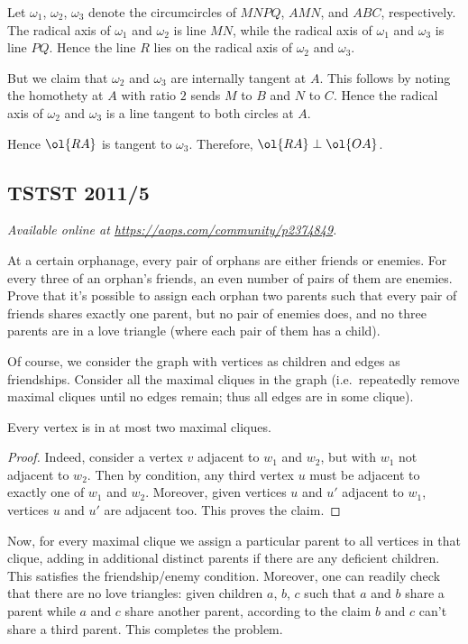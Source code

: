 \documentclass[11pt]{scrartcl}
\begin{document}
Let $\omega_1$, $\omega_2$, $\omega_3$ denote the circumcircles of
$MNPQ$, $AMN$, and $ABC$, respectively.
The radical axis of $\omega_1$ and $\omega_2$ is line $MN$, while the
radical axis of $\omega_1$ and $\omega_3$ is line $PQ$.
Hence the line $R$ lies on the radical axis of $\omega_2$ and $\omega_3$.

But we claim that $\omega_2$ and $\omega_3$ are internally tangent at $A$.
This follows by noting the homothety at $A$ with ratio $2$ sends
$M$ to $B$ and $N$ to $C$.
Hence the radical axis of $\omega_2$ and $\omega_3$ is a line tangent to
both circles at $A$.

Hence $\ol{RA}$ is tangent to $\omega_3$.
Therefore, $\ol{RA} \perp \ol{OA}$.
\pagebreak

\subsection{TSTST 2011/5}
\textsl{Available online at \url{https://aops.com/community/p2374849}.}
\begin{mdframed}[style=mdpurplebox,frametitle={Problem statement}]
At a certain orphanage, every pair of orphans are either friends or enemies.
For every three of an orphan's friends,
an even number of pairs of them are enemies.
Prove that it's possible to assign each orphan two parents
such that every pair of friends shares exactly one parent, but no pair of enemies does,
and no three parents are in a love triangle (where each pair of them has a child).
\end{mdframed}
Of course, we consider the graph with vertices as children and edges as friendships.
Consider all the maximal cliques in the graph
(i.e.\ repeatedly remove maximal cliques until no edges remain;
thus all edges are in some clique).

\begin{claim*}
Every vertex is in at most two maximal cliques.
\end{claim*}

\begin{proof}
Indeed, consider a vertex $v$ adjacent to $w_1$ and $w_2$,
but with $w_1$ not adjacent to $w_2$.
Then by condition, any third vertex $u$
must be adjacent to exactly one of $w_1$ and $w_2$.
Moreover, given vertices $u$ and $u'$ adjacent to $w_1$,
vertices $u$ and $u'$ are adjacent too.
This proves the claim.
\end{proof}

Now, for every maximal clique we assign a particular parent
to all vertices in that clique,
adding in additional distinct parents if there are any deficient children.
This satisfies the friendship/enemy condition.
Moreover, one can readily check that there are no love triangles:
given children $a$, $b$, $c$
such that $a$ and $b$ share a parent
while $a$ and $c$ share another parent,
according to the claim $b$ and $c$ can't share a third parent.
This completes the problem.
\end{document}
